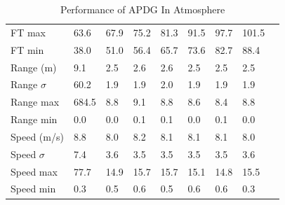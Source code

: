 \begin{table}[H]
\begin{tabularx}{\textwidth}{@{}lYYYYYYYY@{}}
		FT max & 63.6 & 67.9 & 75.2 & 81.3 & 91.5 & 97.7 & 101.5 \\                      
                                                                         
		FT min & 38.0 & 51.0 & 56.4 & 65.7 & 73.6 & 82.7 & 88.4 \\                       
            \toprule                                                              
		Range (m) & 9.1 & 2.5 & 2.6 & 2.6 & 2.5 & 2.5 & 2.5 \\                           
                                                                          
		Range $\sigma$ & 60.2 & 1.9 & 1.9 & 2.0 & 1.9 & 1.9 & 1.9 \\                     
                                                                         
		Range max & 684.5 & 8.8 & 9.1 & 8.8 & 8.6 & 8.4 & 8.8 \\                         
                                                                         
		Range min & 0.0 & 0.0 & 0.1 & 0.1 & 0.0 & 0.1 & 0.0 \\                           
             \toprule                                                             
		Speed (m/s) & 8.8 & 8.0 & 8.2 & 8.1 & 8.1 & 8.1 & 8.0 \\                         
                                                                         
		Speed $\sigma$ & 7.4 & 3.6 & 3.5 & 3.5 & 3.5 & 3.5 & 3.6 \\                      
                                                                      
		Speed max & 77.7 & 14.9 & 15.7 & 15.7 & 15.1 & 14.8 & 15.5 \\                    
                                                                         
		Speed min & 0.3 & 0.5 & 0.6 & 0.5 & 0.6 & 0.6 & 0.3 \\                           
\bottomrule                                                                          
	\end{tabularx}                                                                    
	\caption{Performance of APDG In Atmosphere}                                      
	\label{tab:disppowatmo}                                                          
\end{table}  

